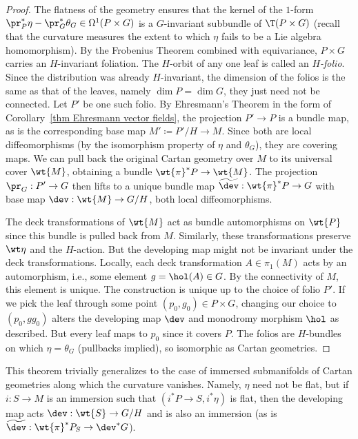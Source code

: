 \begin{proof}
    The flatness of the geometry ensures that the kernel of the $1$-form $\pr_P^\ast\eta-\pr_G^\ast\theta_G\in\Omega^1(P\times G)$ is a $G$-invariant subbundle of $\T(P\times G)$ (recall that the curvature measures the extent to which $\eta$ fails to be a Lie algebra homomorphism).  By the Frobenius Theorem combined with equivariance, $P\times G$ carries an $H$-invariant foliation. The $H$-orbit of any one leaf is called an \emph{$H$-folio}. Since the distribution was already $H$-invariant, the dimension of the folios is the same as that of the leaves, namely $\dim P=\dim G$, they just need not be connected. Let $P'$ be one such folio. By Ehresmann's Theorem in the form of Corollary~\ref{thm Ehresmann vector fields}, the projection $P'\to P$ is a bundle map, as is the corresponding base map $M'\coloneqq P'\slash H\to M$. Since both are local diffeomorphisms (by the isomorphism property of $\eta$ and $\theta_G$), they are covering maps. We can pull back the original Cartan geometry over $M$ to its universal cover $\wt{M}$, obtaining a bundle $\wt{\pi}^\ast P\to \wt{M}$. The projection $\pr_G:P'\to G$ then lifts to a unique bundle map $\widetilde{\dev}:\wt{\pi}^\ast P\to G$ with base map $\dev:\wt{M}\to G\slash H$, both local diffeomorphisms.

    The deck transformations of $\wt{M}$ act as bundle automorphisms on $\wt{P}$ since this bundle is pulled back from $M$. Similarly, these transformations preserve $\wt\eta$ and the $H$-action. But the developing map might not be invariant under the deck transformations. Locally, each deck transformation $A\in\pi_1(M)$ acts by an automorphism, i.e., some element $g=\hol(A)\in G$. By the connectivity of $M$, this element is unique. The construction is unique up to the choice of folio $P'$. If we pick the leaf through some point $(p_0,g_0)\in P\times G$, changing our choice to $(p_0,gg_0)$ alters the developing map $\dev$ and monodromy morphism $\hol$ as described. But every leaf maps to $p_0$ since it covers $P$. The folios are $H$-bundles on which $\eta=\theta_G$ (pullbacks implied), so isomorphic as Cartan geometries.
\end{proof}

\begin{rem}
    This theorem trivially generalizes to the case of immersed submanifolds of Cartan geometries along which the curvature vanishes. Namely, $\eta$ need not be flat, but if $i:S\to M$ is an immersion such that $(i^\ast P\to S,i^\ast\eta)$ is flat, then the developing map acts $\dev:\wt{S}\to G\slash H$ and is also an immersion (as is $\widetilde{\dev}:\wt{\pi}^\ast P_S\to \dev^\ast G$).
\end{rem}


